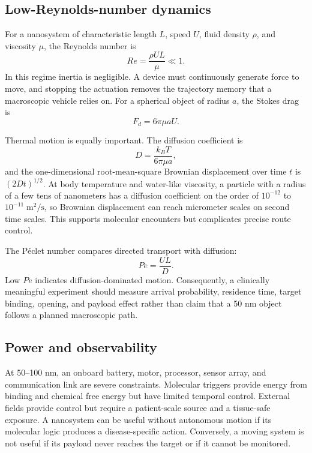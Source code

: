 \documentclass[conference]{IEEEtran}
\begin{document}
\subsection{Low-Reynolds-number dynamics}
For a nanosystem of characteristic length $L$, speed $U$, fluid density $\rho$, and viscosity $\mu$, the Reynolds number is
\begin{equation}
Re=\frac{\rho U L}{\mu}\ll 1.
\label{eq:re}
\end{equation}
In this regime inertia is negligible. A device must continuously generate force to move, and stopping the actuation removes the trajectory memory that a macroscopic vehicle relies on. For a spherical object of radius $a$, the Stokes drag is
\begin{equation}
F_d=6\pi\mu aU.
\label{eq:drag}
\end{equation}

Thermal motion is equally important. The diffusion coefficient is
\begin{equation}
D=\frac{k_BT}{6\pi\mu a},
\label{eq:diffusion}
\end{equation}
and the one-dimensional root-mean-square Brownian displacement over time $t$ is $(2Dt)^{1/2}$. At body temperature and water-like viscosity, a particle with a radius of a few tens of nanometers has a diffusion coefficient on the order of $10^{-12}$ to $10^{-11}\;\mathrm{m^2/s}$, so Brownian displacement can reach micrometer scales on second time scales. This supports molecular encounters but complicates precise route control.

The Péclet number compares directed transport with diffusion:
\begin{equation}
Pe=\frac{UL}{D}.
\label{eq:pe}
\end{equation}
Low $Pe$ indicates diffusion-dominated motion. Consequently, a clinically meaningful experiment should measure arrival probability, residence time, target binding, opening, and payload effect rather than claim that a 50 nm object follows a planned macroscopic path.

\subsection{Power and observability}
At 50--100 nm, an onboard battery, motor, processor, sensor array, and communication link are severe constraints. Molecular triggers provide energy from binding and chemical free energy but have limited temporal control. External fields provide control but require a patient-scale source and a tissue-safe exposure. A nanosystem can be useful without autonomous motion if its molecular logic produces a disease-specific action. Conversely, a moving system is not useful if its payload never reaches the target or if it cannot be monitored.
\end{document}
